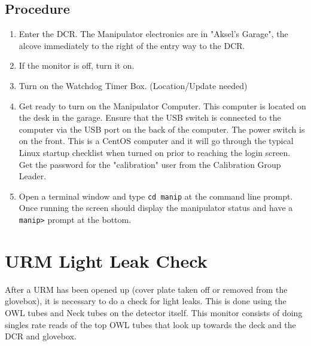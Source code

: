 \subsection{Procedure}
\begin{enumerate}
\item \CheckBox[name=ms1]{} Enter the DCR. The Manipulator electronics are in "Aksel's Garage", the alcove immediately to the right of the entry way to the DCR.
\item \CheckBox[name=ms2]{} If the monitor is off, turn it on.
\item \CheckBox[name=ms4]{} Turn on the Watchdog Timer Box. (Location/Update needed)
\item \CheckBox[name=ms5]{} Get ready to turn on the Manipulator Computer. This computer is located on the desk in the garage. Ensure that the USB switch is connected to the computer via the USB port on the back of the computer. The power switch is on the front. This is a CentOS computer and it will go through the typical Linux startup checklist when turned on prior to reaching the login screen. Get the password for the "calibration" user from the Calibration Group Leader.
\item \CheckBox[name=ms6]{} Open a terminal window and type \verb+cd manip+ at the command line prompt. Once running the screen should display the manipulator status and have a \verb+manip>+ prompt at the bottom.
\end{enumerate}
\section{URM Light Leak Check}\label{sec:ullc}

  After a URM has been opened up (cover plate taken off or removed
from the  glovebox), it is necessary to do a check for light  leaks.
This is done using the OWL tubes and Neck tubes on the detector
itself.  This monitor consists of doing singles rate reads of the
top OWL tubes that look up towards the deck and the DCR and 
glovebox.  



